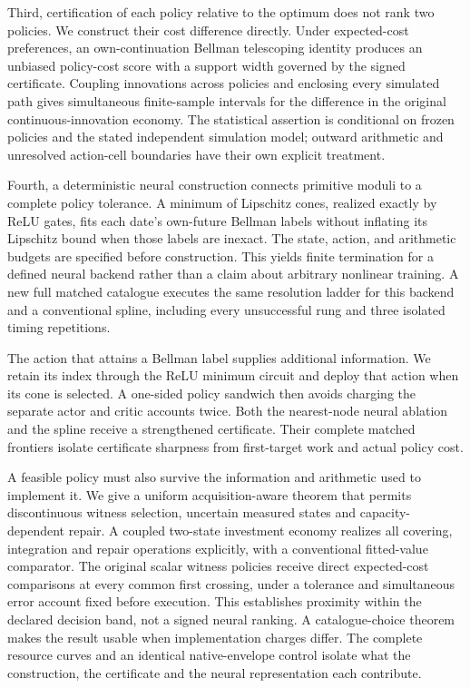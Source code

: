 \documentclass[ecta,nameyear,draft]{econsocart}
\begin{document}
Third, certification of each policy relative to the optimum does not rank two policies. We construct their cost difference directly. Under expected-cost preferences, an own-continuation Bellman telescoping identity produces an unbiased policy-cost score with a support width governed by the signed certificate. Coupling innovations across policies and enclosing every simulated path gives simultaneous finite-sample intervals for the difference in the original continuous-innovation economy. The statistical assertion is conditional on frozen policies and the stated independent simulation model; outward arithmetic and unresolved action-cell boundaries have their own explicit treatment.

Fourth, a deterministic neural construction connects primitive moduli to a complete policy tolerance. A minimum of Lipschitz cones, realized exactly by ReLU gates, fits each date's own-future Bellman labels without inflating its Lipschitz bound when those labels are inexact. The state, action, and arithmetic budgets are specified before construction. This yields finite termination for a defined neural backend rather than a claim about arbitrary nonlinear training. A new full matched catalogue executes the same resolution ladder for this backend and a conventional spline, including every unsuccessful rung and three isolated timing repetitions.

The action that attains a Bellman label supplies additional information. We retain its index through the ReLU minimum circuit and deploy that action when its cone is selected. A one-sided policy sandwich then avoids charging the separate actor and critic accounts twice. Both the nearest-node neural ablation and the spline receive a strengthened certificate. Their complete matched frontiers isolate certificate sharpness from first-target work and actual policy cost.

A feasible policy must also survive the information and arithmetic used to implement it. We give a uniform acquisition-aware theorem that permits discontinuous witness selection, uncertain measured states and capacity-dependent repair. A coupled two-state investment economy realizes all covering, integration and repair operations explicitly, with a conventional fitted-value comparator. The original scalar witness policies receive direct expected-cost comparisons at every common first crossing, under a tolerance and simultaneous error account fixed before execution. This establishes proximity within the declared decision band, not a signed neural ranking. A catalogue-choice theorem makes the result usable when implementation charges differ. The complete resource curves and an identical native-envelope control isolate what the construction, the certificate and the neural representation each contribute.
\end{document}

